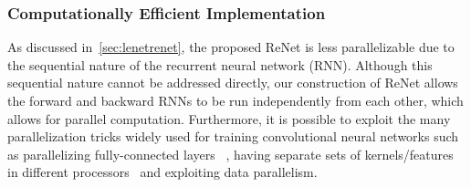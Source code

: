 \subsubsection{Computationally Efficient Implementation}
As discussed in~\autoref{sec:lenetrenet}, the proposed ReNet is less
parallelizable due to the sequential nature of the recurrent neural network
(RNN). Although this sequential nature cannot be addressed directly, our
construction of ReNet allows the forward and backward RNNs to be run
independently from each other, which allows for parallel computation.
Furthermore, it is possible to exploit the many parallelization tricks widely
used for training convolutional neural networks such as parallelizing
fully-connected layers ~\citep{krizhevsky2014one}, having separate sets of
kernels/features in different processors~\citep{Krizhevsky-2012} and exploiting
data parallelism.

